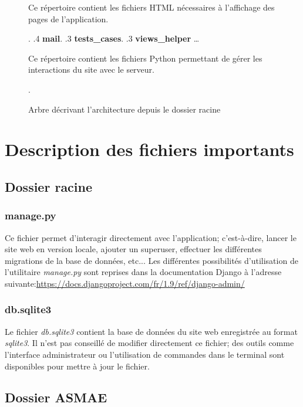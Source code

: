 \begin{figure}[!ht]
\begin{framed}
{\begin{minipage}[t]{10cm}
									Ce répertoire contient les fichiers
									HTML nécessaires à l'affichage des pages
									de l'application{.}
									\end{minipage}.
			.4 \textbf{mail}.
			.3 \textbf{tests\_cases}.
			.3 \textbf{views\_helper} \ldots{} \begin{minipage}[t]{10cm}
									Ce répertoire contient les fichiers
									Python permettant de gérer les interactions
									du site avec le serveur{.}
									\end{minipage}.
		}
	\end{framed}
	\caption{Arbre décrivant l'architecture depuis le dossier racine}
	\label{fig:Architecture des dossiers}
\end{figure}
\FloatBarrier

\section{Description des fichiers importants}

\subsection{Dossier racine}

\subsubsection{manage.py}

Ce fichier permet d'interagir directement avec l'application; c'est-à-dire, lancer le site web en version locale, ajouter un superuser, effectuer les différentes migrations de la base de données, etc... Les différentes possibilités d'utilisation de l'utilitaire \textit{manage.py} sont reprises dans la documentation Django à l'adresse suivante:\url{https://docs.djangoproject.com/fr/1.9/ref/django-admin/}

\subsubsection{db.sqlite3}

Le fichier \textit{db.sqlite3} contient la base de données du site web enregistrée au format \textit{sqlite3}. Il n'est pas conseillé de modifier directement ce fichier; des outils comme l'interface administrateur ou l'utilisation de commandes dans le terminal sont disponibles pour mettre à jour le fichier.

\subsection{Dossier ASMAE}

